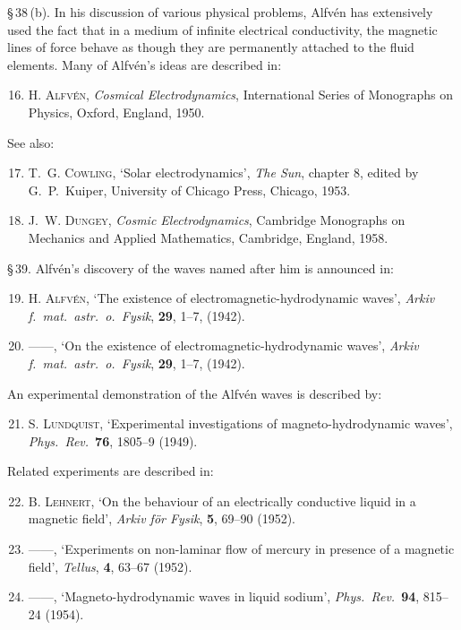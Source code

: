 \S\,38\,(b). In his discussion of various physical problems, Alfv\'en has extensively used the fact that in a medium of infinite electrical conductivity, the magnetic lines of force behave as though they are permanently attached to the fluid elements. Many of Alfv\'en's ideas are described in:
\begin{enumerate}
\setcounter{enumi}{15}
\item H. \textsc{Alfv\'en}, \emph{Cosmical Electrodynamics}, International Series of Monographs on Physics, Oxford, England, 1950.
\end{enumerate}

See also:
\begin{enumerate}
\setcounter{enumi}{16}
\item T.~G. \textsc{Cowling}, `Solar electrodynamics', \emph{The Sun}, chapter 8, edited by G.~P.~Kuiper, University of Chicago Press, Chicago, 1953.
\item J.~W. \textsc{Dungey}, \emph{Cosmic Electrodynamics}, Cambridge Monographs on Mechanics and Applied Mathematics, Cambridge, England, 1958.
\end{enumerate}

\S\,39. Alfv\'en's discovery of the waves named after him is announced in:
\begin{enumerate}
\setcounter{enumi}{18}
\item H. \textsc{Alfv\'en}, `The existence of electromagnetic-hydrodynamic waves', \emph{Arkiv f.\ mat.\ astr.\ o.\ Fysik}, \textbf{29}, 1--7, (1942).
\item ------, `On the existence of electromagnetic-hydrodynamic waves', \emph{Arkiv f.\ mat.\ astr.\ o.\ Fysik}, \textbf{29}, 1--7, (1942).
\end{enumerate}

An experimental demonstration of the Alfv\'en waves is described by:
\begin{enumerate}
\setcounter{enumi}{20}
\item S. \textsc{Lundquist}, `Experimental investigations of magneto-hydrodynamic waves', \emph{Phys.\ Rev.}\ \textbf{76}, 1805--9 (1949).
\end{enumerate}

Related experiments are described in:
\begin{enumerate}
\setcounter{enumi}{21}
\item B. \textsc{Lehnert}, `On the behaviour of an electrically conductive liquid in a magnetic field', \emph{Arkiv f\"or Fysik}, \textbf{5}, 69--90 (1952).
\item ------, `Experiments on non-laminar flow of mercury in presence of a magnetic field', \emph{Tellus}, \textbf{4}, 63--67 (1952).
\item ------, `Magneto-hydrodynamic waves in liquid sodium', \emph{Phys.\ Rev.}\ \textbf{94}, 815--24 (1954).
\end{enumerate}


